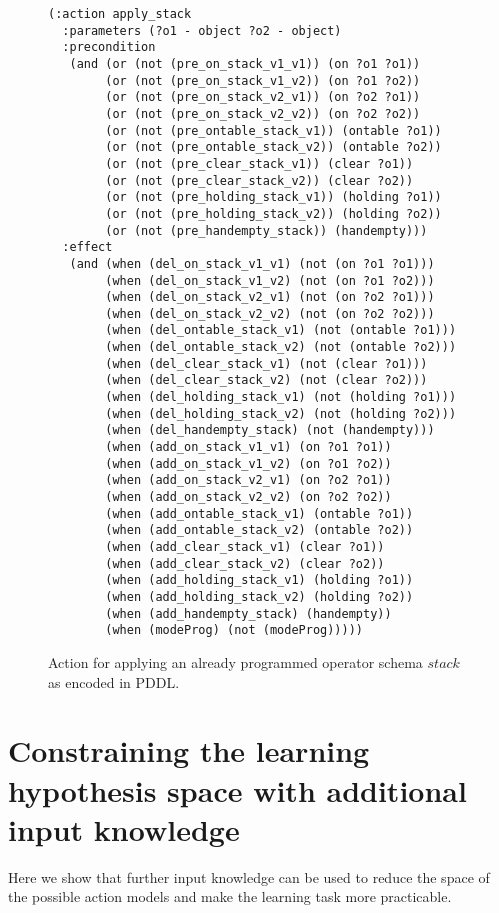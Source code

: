 \documentclass[letterpaper]{article} %
\begin{document}
\begin{figure}[hbt]
\begin{scriptsize}
\begin{verbatim}
(:action apply_stack
  :parameters (?o1 - object ?o2 - object)
  :precondition
   (and (or (not (pre_on_stack_v1_v1)) (on ?o1 ?o1))
        (or (not (pre_on_stack_v1_v2)) (on ?o1 ?o2))
        (or (not (pre_on_stack_v2_v1)) (on ?o2 ?o1))
        (or (not (pre_on_stack_v2_v2)) (on ?o2 ?o2))
        (or (not (pre_ontable_stack_v1)) (ontable ?o1))
        (or (not (pre_ontable_stack_v2)) (ontable ?o2))
        (or (not (pre_clear_stack_v1)) (clear ?o1))
        (or (not (pre_clear_stack_v2)) (clear ?o2))
        (or (not (pre_holding_stack_v1)) (holding ?o1))
        (or (not (pre_holding_stack_v2)) (holding ?o2))
        (or (not (pre_handempty_stack)) (handempty)))
  :effect
   (and (when (del_on_stack_v1_v1) (not (on ?o1 ?o1)))
        (when (del_on_stack_v1_v2) (not (on ?o1 ?o2)))
        (when (del_on_stack_v2_v1) (not (on ?o2 ?o1)))
        (when (del_on_stack_v2_v2) (not (on ?o2 ?o2)))
        (when (del_ontable_stack_v1) (not (ontable ?o1)))
        (when (del_ontable_stack_v2) (not (ontable ?o2)))
        (when (del_clear_stack_v1) (not (clear ?o1)))
        (when (del_clear_stack_v2) (not (clear ?o2)))
        (when (del_holding_stack_v1) (not (holding ?o1)))
        (when (del_holding_stack_v2) (not (holding ?o2)))
        (when (del_handempty_stack) (not (handempty)))
        (when (add_on_stack_v1_v1) (on ?o1 ?o1))
        (when (add_on_stack_v1_v2) (on ?o1 ?o2))
        (when (add_on_stack_v2_v1) (on ?o2 ?o1))
        (when (add_on_stack_v2_v2) (on ?o2 ?o2))
        (when (add_ontable_stack_v1) (ontable ?o1))
        (when (add_ontable_stack_v2) (ontable ?o2))
        (when (add_clear_stack_v1) (clear ?o1))
        (when (add_clear_stack_v2) (clear ?o2))
        (when (add_holding_stack_v1) (holding ?o1))
        (when (add_holding_stack_v2) (holding ?o2))
        (when (add_handempty_stack) (handempty))
        (when (modeProg) (not (modeProg)))))
\end{verbatim}
\end{scriptsize}
 \caption{\small Action for applying an already programmed operator schema $stack$ as encoded in PDDL.}
\label{fig:compilation}
\end{figure}


\section{Constraining the learning hypothesis space with additional input knowledge}
Here we show that further input knowledge can be used to reduce the space of the possible action models and make the learning task more practicable.
\end{document}
